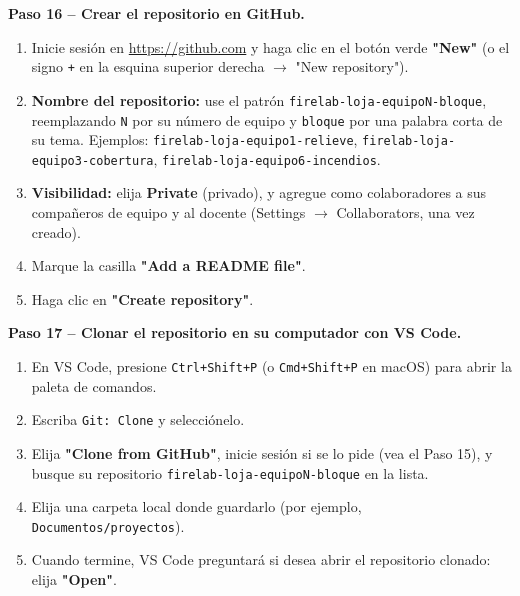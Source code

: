 \documentclass[11pt,a4paper]{article}
\newcommand{\code}[1]{\texttt{#1}}
\newcommand{\link}[1]{\url{#1}}
\begin{document}
\begin{stepbox}
\textbf{Paso 16 -- Crear el repositorio en GitHub.}
\begin{enumerate}
  \item Inicie sesión en \link{https://github.com} y haga clic en el botón verde \textbf{"New"} (o el signo \code{+} en la esquina superior derecha $\to$ "New repository").
  \item \textbf{Nombre del repositorio:} use el patrón \code{firelab-loja-equipoN-bloque}, reemplazando \code{N} por su número de equipo y \code{bloque} por una palabra corta de su tema. Ejemplos: \code{firelab-loja-equipo1-relieve}, \code{firelab-loja-equipo3-cobertura}, \code{firelab-loja-equipo6-incendios}.
  \item \textbf{Visibilidad:} elija \textbf{Private} (privado), y agregue como colaboradores a sus compañeros de equipo y al docente (Settings $\to$ Collaborators, una vez creado).
  \item Marque la casilla \textbf{"Add a README file"}.
  \item Haga clic en \textbf{"Create repository"}.
\end{enumerate}
\end{stepbox}

\begin{stepbox}
\textbf{Paso 17 -- Clonar el repositorio en su computador con VS Code.}
\begin{enumerate}
  \item En VS Code, presione \code{Ctrl+Shift+P} (o \code{Cmd+Shift+P} en macOS) para abrir la paleta de comandos.
  \item Escriba \code{Git: Clone} y selecciónelo.
  \item Elija \textbf{"Clone from GitHub"}, inicie sesión si se lo pide (vea el Paso 15), y busque su repositorio \code{firelab-loja-equipoN-bloque} en la lista.
  \item Elija una carpeta local donde guardarlo (por ejemplo, \code{Documentos/proyectos}).
  \item Cuando termine, VS Code preguntará si desea abrir el repositorio clonado: elija \textbf{"Open"}.
\end{enumerate}
\end{stepbox}
\end{document}
